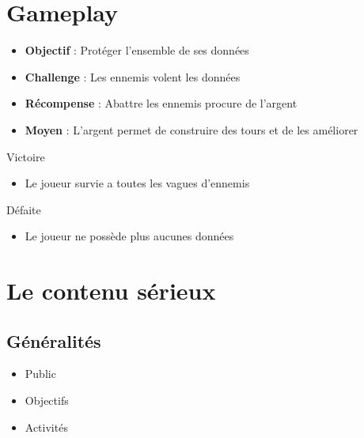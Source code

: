\documentclass[usepdftitle=false]{beamer}
\begin{document}
	\section{Gameplay}
		\begin{frame}
			\center
			\begin{itemize}
				\item \textbf{Objectif} : Protéger l'ensemble de ses données
				\item \textbf{Challenge} : Les ennemis volent les données
				\item \textbf{Récompense} : Abattre les ennemis procure de l'argent
				\item \textbf{Moyen} : L'argent permet de construire des tours et de les améliorer
			\end{itemize}
		\end{frame}
		
		\begin{frame}
			Victoire
			\begin{itemize}
				\item Le joueur survie a toutes les vagues d'ennemis
			\end{itemize}
			Défaite
			\begin{itemize}
				\item Le joueur ne possède plus aucunes données
			\end{itemize}
		\end{frame}
	
	\section{Le contenu sérieux}
	\subsection{Généralités}
	\begin{frame}
		\begin{itemize}
			\item Public
			\item Objectifs
			\item Activités
		\end{itemize}
	\end{frame}
	
\end{document}
